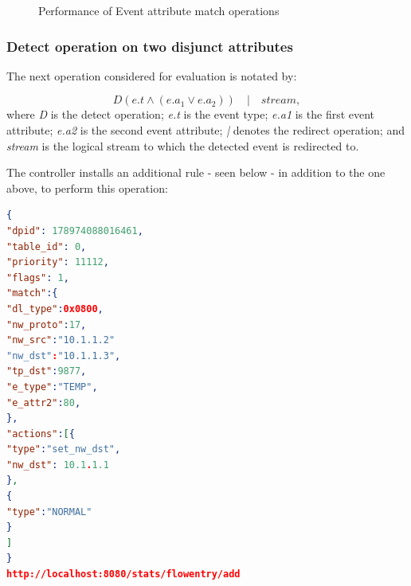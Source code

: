 \mydata



\begin{figure}[H]
	\centering
	\caption{Performance of Event attribute match operations}
\end{figure}

\subsubsection{Detect operation on two disjunct attributes}

The next operation considered for evaluation is notated by:

\begin{equation}D(e.t  \wedge (e.a_1 \vee e.a_2)) \quad | \quad stream, \end{equation}
where \textit{D} is the detect operation; \newline
\textit{e.t} is the event type; \newline
\textit{e.a1} is the first event attribute; \newline
\textit{e.a2} is the second event attribute;
\textit{|} denotes the redirect operation; \newline
and \textit{stream} is the logical stream to which the detected event is redirected to. \newline \newline

The controller installs an additional rule - seen below - in addition to the one above, to perform this operation:
\begin{lstlisting}[language=json,firstnumber=1]
{
"dpid": 178974088016461,
"table_id": 0,
"priority": 11112,
"flags": 1,
"match":{
"dl_type":0x0800,
"nw_proto":17,
"nw_src":"10.1.1.2"
"nw_dst":"10.1.1.3",
"tp_dst":9877,
"e_type":"TEMP",
"e_attr2":80,
},
"actions":[{
"type":"set_nw_dst",
"nw_dst": 10.1.1.1
},
{
"type":"NORMAL"
}
]
}
http://localhost:8080/stats/flowentry/add \end{lstlisting}

